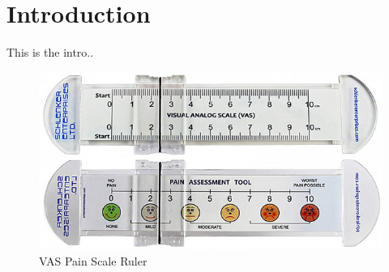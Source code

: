 \chapter{Introduction}

This is the intro.. 


\begin{figure}[h!]
    \centering
    \includegraphics[width=1\textwidth]{figures/real_vas.jpg}
    \caption{VAS Pain Scale Ruler\cite{real_vas}}
    \label{50shades}
\end{figure}
